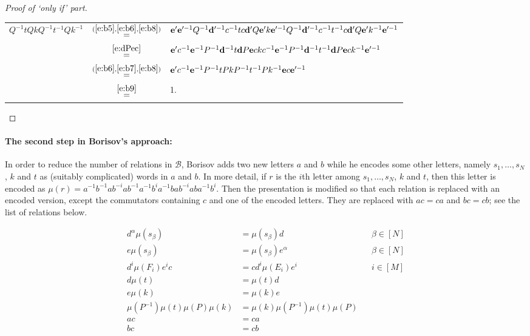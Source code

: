 \documentclass[10pt,a4paper]{article}
\theoremstyle{definition}
\theoremstyle{remark}
\newcommand\BB{\mathcal{B}}
\newcommand\makevec[1]{{\bf #1}}
\def \dd {\makevec{d}}
\def \ee {\makevec{e}}
\begin{document}
\begin{proof}[Proof of `only if' part]
  \begin{tabular}{rcl}
    $Q^{-1}tQkQ^{-1}t^{-1}Qk^{-1}$
    &
    $\stackrel{(\ref{e:b5},\ref{e:b6},\ref{e:b8})}{=}$ &
    $\ee' \ee'^{-1} Q^{-1}   \dd'^{-1} c^{-1} t c
    \dd' Q\ee' k \ee'^{-1} Q^{-1} \dd'^{-1} c^{-1} t^{-1} c \dd' Q \ee' k^{-1}
    \ee'^{-1}$ \\
    &
    $\stackrel{\eqref{e:dPec}}{=}$ & $\ee' c^{-1} \ee^{-1} P^{-1} \dd^{-1} t \dd P
    \ee c k c^{-1} \ee^{-1} P^{-1} \dd^{-1} t^{-1} \dd P \ee c k^{-1}
    \ee'^{-1}$
    \\
    & $\stackrel{(\ref{e:b6},\ref{e:b7},\ref{e:b8})}{=}$ & $\ee' c^{-1} \ee^{-1}
    P^{-1} t P k P^{-1} t^{-1} P k^{-1} \ee c \ee'^{-1}$ \\
    & $\stackrel{\eqref{e:b9}}{=}$ & 1.
  \end{tabular}
\end{proof}



\paragraph{The second step in Borisov's approach:} In order to reduce the
number of relations in $\BB$, Borisov adds two new letters $a$ and $b$ while he
encodes some other letters, namely $s_1, \dots, s_N$, $k$ and $t$ as (suitably
complicated) words in $a$ and $b$. In more detail, if $r$ is the $i$th letter
among $s_1, \dots, s_N$, $k$ and $t$, then this letter is encoded as 
$\mu(r) = a^{-1}b^{-1}ab^{-i}ab^{-1}a^{-1}b^ia^{-1}bab^{-i}aba^{-1}b^i$. Then
the presentation is modified so that each relation is replaced with an encoded
version, except the commutators containing $c$ and one of the encoded letters.
They are replaced with $ac = ca$ and $bc = cb$; see the list of relations
below.

\begin{align*}
  d^{\alpha} \mu(s_\beta) &= \mu(s_\beta) d & &\beta \in [N] \tag{BE1}
  \label{e:be1} \\
  e\mu(s_{\beta}) &= \mu(s_{\beta})e^{\alpha} & &\beta \in [N] \tag{BE2}
  \label{e:be2} \\
  d^i\mu(F_i)e^ic &= cd^i\mu(E_i)e^i & &i \in [M] \tag{BE4} \label{e:be4} \\
  d\mu(t) &= \mu(t)d & \tag{BE6} \label{e:be6} \\
  e\mu(k) &= \mu(k)e & \tag{BE8} \label{e:be8} \\
  \mu(P^{-1})\mu(t)\mu(P)\mu(k) &= \mu(k)\mu(P^{-1})\mu(t)\mu(P) &
  \label{e:be9}  \tag{BE9} \\
  ac &= ca & \tag{BE10} \label{e:be10} \\
  bc &= cb & \tag{BE11} \label{e:be11}
\end{align*}
\end{document}
